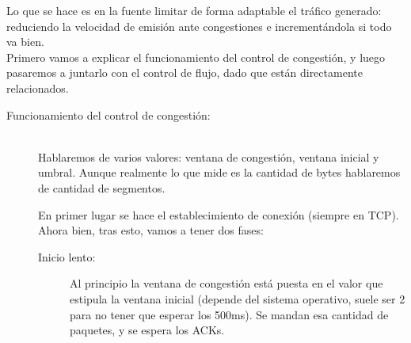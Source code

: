 Lo que se hace es en la fuente limitar de forma adaptable el tráfico generado: reduciendo la velocidad de emisión ante congestiones e incrementándola si todo va bien. \\

Primero vamos a explicar el funcionamiento del control de congestión, y luego pasaremos a juntarlo con el control de flujo, dado que están directamente relacionados.

\begin{description}
    \item [Funcionamiento del control de congestión:]~\\
Hablaremos de varios valores: ventana de congestión, ventana inicial y umbral. Aunque realmente lo que mide es la cantidad de bytes hablaremos de cantidad de segmentos. 

En primer lugar se hace el establecimiento de conexión (siempre en TCP). Ahora bien, tras esto, vamos a tener dos fases:
\begin{description}
    \item [Inicio lento:] Al principio la ventana de congestión está puesta en el valor que estipula la ventana inicial (depende del sistema operativo, suele ser 2 para no tener que esperar los \unit{500}{ms}). Se mandan esa cantidad de paquetes, y se espera los ACKs. \\


\end{description}
\end{description}

